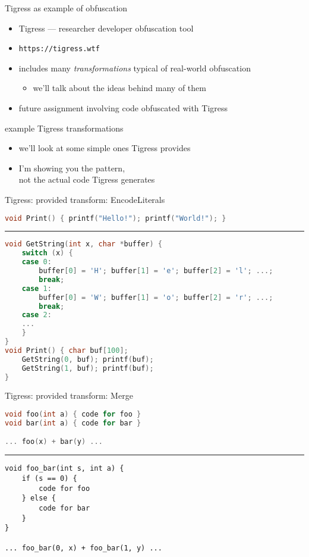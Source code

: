 \begin{frame}{Tigress as example of obfuscation}
    \begin{itemize}
    \item Tigress --- researcher developer obfuscation tool
    \item \texttt{https://tigress.wtf}
    \item includes many \textit{transformations} typical of real-world obfuscation
        \begin{itemize}
        \item we'll talk about the ideas behind many of them
        \end{itemize}
    \vspace{.5cm}
    \item future assignment involving code obfuscated with Tigress
    \end{itemize}
\end{frame}
\begin{frame}{example Tigress transformations}
    \begin{itemize}
    \item we'll look at some simple ones Tigress provides
    \item I'm showing you the pattern, \\ not the actual code Tigress generates
    \end{itemize}
\end{frame}

\begin{frame}[fragile,label=TigressEncpde]{Tigress: provided transform: EncodeLiterals}
\begin{lstlisting}[language=C++,style=size10]
void Print() { printf("Hello!"); printf("World!"); }
\end{lstlisting}
\hrule
\begin{lstlisting}[language=C++,style=size10]
void GetString(int x, char *buffer) {
    switch (x) {
    case 0:
        buffer[0] = 'H'; buffer[1] = 'e'; buffer[2] = 'l'; ...;
        break;
    case 1:
        buffer[0] = 'W'; buffer[1] = 'o'; buffer[2] = 'r'; ...;
        break;
    case 2:
    ...
    }
}
void Print() { char buf[100];
    GetString(0, buf); printf(buf);
    GetString(1, buf); printf(buf);
}
\end{lstlisting}
\end{frame}

\begin{frame}[fragile,label=TigressMerge]{Tigress: provided transform: Merge}
\begin{lstlisting}[language=C++,style=smaller]
void foo(int a) { code for foo }
void bar(int a) { code for bar }

... foo(x) + bar(y) ...
\end{lstlisting}
\hrule
\begin{lstlisting}
void foo_bar(int s, int a) {
    if (s == 0) {
        code for foo
    } else {
        code for bar
    }
}

... foo_bar(0, x) + foo_bar(1, y) ...
\end{lstlisting}
\end{frame}

